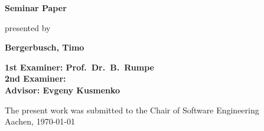 \begin{titlepage}
\begin{flushleft}
{    {\Large \textbf{Seminar Paper}\\}
		\vspace{3em} 
		
		{\large presented by\\} 
    
    {\LARGE \textbf{Bergerbusch, Timo}\\}
    \vspace{3em} 
		    
    {\Large \textbf{1st Examiner: Prof.\ Dr.\ B.\ Rumpe}\\}
    \vspace{1em} 
    {\Large \textbf{2nd Examiner: }\\}
    \vspace{1em} 
    {\Large \textbf{Advisor: Evgeny Kusmenko}\\}
    \vspace{7em} 

    {\large The present work was submitted to the Chair of Software Engineering \\}
    \vspace{1em}
		{\large	Aachen, \today\\}
  }
\end{flushleft}

\end{titlepage}






